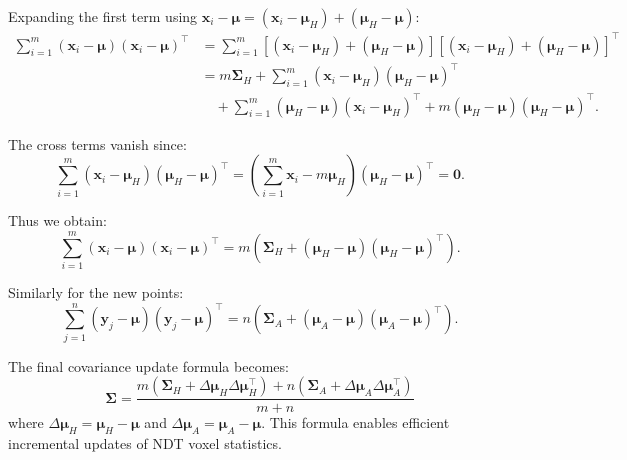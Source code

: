 Expanding the first term using $\bm{x}_i - \boldsymbol{\mu} = (\bm{x}_i - \boldsymbol{\mu}_H) + (\boldsymbol{\mu}_H - \boldsymbol{\mu})$:
\begin{align}\label{key}
	\sum_{i=1}^{m} (\bm{x}_i - \boldsymbol{\mu})(\bm{x}_i - \boldsymbol{\mu})^\top &= \sum_{i=1}^{m} \left[ (\bm{x}_i - \boldsymbol{\mu}_H) + (\boldsymbol{\mu}_H - \boldsymbol{\mu}) \right] \left[ (\bm{x}_i - \boldsymbol{\mu}_H) + (\boldsymbol{\mu}_H - \boldsymbol{\mu}) \right]^\top \\
	&= m\boldsymbol{\Sigma}_H + \sum_{i=1}^m (\bm{x}_i - \boldsymbol{\mu}_H)(\boldsymbol{\mu}_H - \boldsymbol{\mu})^\top \\
	&\quad + \sum_{i=1}^m (\boldsymbol{\mu}_H - \boldsymbol{\mu})(\bm{x}_i - \boldsymbol{\mu}_H)^\top + m(\boldsymbol{\mu}_H - \boldsymbol{\mu})(\boldsymbol{\mu}_H - \boldsymbol{\mu})^\top.
\end{align}

The cross terms vanish since:
\begin{equation}\label{key}
	\sum_{i=1}^m (\bm{x}_i - \boldsymbol{\mu}_H) (\boldsymbol{\mu}_H - \boldsymbol{\mu})^\top = \left(\sum_{i=1}^m \bm{x}_i - m\boldsymbol{\mu}_H\right)(\boldsymbol{\mu}_H - \boldsymbol{\mu})^\top = \bm{0}.
\end{equation}

Thus we obtain:
\begin{equation}\label{key}
	\sum_{i=1}^{m} (\bm{x}_i - \boldsymbol{\mu})(\bm{x}_i - \boldsymbol{\mu})^\top = m \left(\boldsymbol{\Sigma}_H + (\boldsymbol{\mu}_H - \boldsymbol{\mu})(\boldsymbol{\mu}_H - \boldsymbol{\mu})^\top\right).
\end{equation}

Similarly for the new points:
\begin{equation}\label{key}
	\sum_{j=1}^{n} (\bm{y}_j - \boldsymbol{\mu})(\bm{y}_j - \boldsymbol{\mu})^\top = n \left(\boldsymbol{\Sigma}_A + (\boldsymbol{\mu}_A - \boldsymbol{\mu})(\boldsymbol{\mu}_A - \boldsymbol{\mu})^\top\right).
\end{equation}

The final covariance update formula becomes:
\begin{equation}\label{key}
	\boldsymbol{\Sigma} = \frac{m \left(\boldsymbol{\Sigma}_H + \Delta\boldsymbol{\mu}_H \Delta\boldsymbol{\mu}_H^\top\right) + n \left(\boldsymbol{\Sigma}_A + \Delta\boldsymbol{\mu}_A \Delta\boldsymbol{\mu}_A^\top\right)}{m+n}
\end{equation}
where $\Delta\boldsymbol{\mu}_H = \boldsymbol{\mu}_H - \boldsymbol{\mu}$ and $\Delta\boldsymbol{\mu}_A = \boldsymbol{\mu}_A - \boldsymbol{\mu}$. This formula enables efficient incremental updates of NDT voxel statistics.

